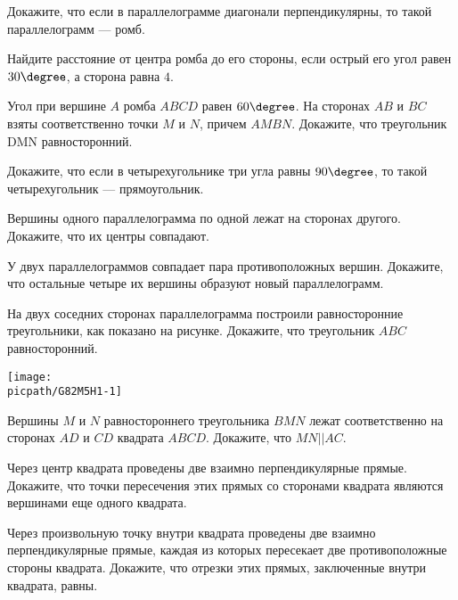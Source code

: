 \begin{homework}[number=1]
	\begin{listofex}
		\item Докажите, что если в параллелограмме диагонали перпендикулярны, то такой параллелограмм --- ромб.
		\item Найдите расстояние от центра ромба до его стороны, если острый его угол равен \( 30\degree \), а сторона равна \( 4 \).
		\item Угол при вершине \( A \) ромба \( ABCD \) равен \( 60\degree \). На сторонах \( AB \) и \( BC \) взяты соответственно точки \( M \) и \( N \), причем \( AMBN \). Докажите, что треугольник DMN равносторонний.
		\item Докажите, что если в четырехугольнике три угла равны \( 90\degree \), то такой четырехугольник --- прямоугольник.
		\item {}
	\end{listofex}
\end{homework}

\begin{class}[number=3]
	\begin{listofex}
		\item Вершины одного параллелограмма по одной лежат на сторонах другого. Докажите, что их центры совпадают.
		\item У двух параллелограммов совпадает пара противоположных вершин. Докажите, что остальные четыре их вершины образуют новый параллелограмм.
		\item На двух соседних сторонах параллелограмма построили равносторонние треугольники, как показано на рисунке. Докажите, что треугольник \( ABC \) равносторонний.
		\begin{center}
			\texttt{[image: \\picpath/G82M5H1-1]}
		\end{center}
		\item Вершины \( M \) и \( N \) равностороннего треугольника \( BMN \)
		лежат соответственно на сторонах \( AD \) и \( CD \) квадрата \( ABCD \).
		Докажите, что \( MN || AC \).
		\item Через центр квадрата проведены две взаимно
		перпендикулярные прямые. Докажите, что точки пересечения этих
		прямых со сторонами квадрата являются вершинами еще одного
		квадрата.
		\item Через произвольную точку внутри квадрата
		проведены две взаимно перпендикулярные прямые,
		каждая из которых пересекает две противоположные
		стороны квадрата. Докажите, что отрезки этих прямых,
		заключенные внутри квадрата, равны.
	\end{listofex}
\end{class}

